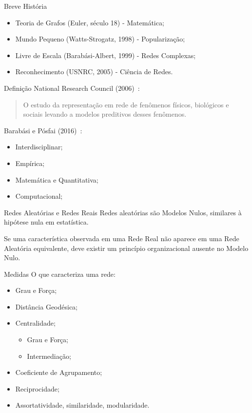 \documentclass[10pt, hyperref={pdfpagelabels=false}]{beamer}
\begin{document}
\begin{frame}[label=historia]{Breve História}
  \begin{itemize}
    \item Teoria de Grafos (Euler, século 18) - Matemática;
    \item Mundo Pequeno (Watts-Strogatz, 1998) - Popularização;
    \item Livre de Escala (Barabási-Albert, 1999) - Redes Complexas;
    \item Reconhecimento (USNRC, 2005) - \alert{Ciência de Redes}.
  \end{itemize}
\end{frame}

\begin{frame}[label=definicao]{Definição}
  National Research Council (2006)~\cite{National_Research_Council2006-lv}:
  \begin{quote}
    O estudo da representação em rede de fenômenos físicos, biológicos e sociais levando a modelos preditivos desses fenômenos.
  \end{quote}
  Barabási e Pósfai (2016)~\cite{Barabasi2016-rn}:
  \begin{itemize}
    \item Interdisciplinar;
    \item Empírica;
    \item Matemática e Quantitativa;
    \item Computacional;
  \end{itemize}
\end{frame}

\begin{frame}[label=redes]{Redes Aleatórias e Redes Reais}
Redes aleatórias são \alert{Modelos Nulos}, similares à hipótese nula em estatística.

Se uma característica observada em uma \alert{Rede Real} não aparece em uma \alert{Rede Aleatória} equivalente, deve existir um \alert{princípio organizacional} ausente no Modelo Nulo.
\end{frame}

\begin{frame}[label=medidas]{Medidas}
  O que caracteriza uma rede:
  \begin{itemize}
    \item Grau e Força;
    \item Distância Geodésica;
    \item Centralidade;
    \begin{itemize}
      \item Grau e Força;
      \item Intermediação;
    \end{itemize}
    \item Coeficiente de Agrupamento;
    \item Reciprocidade;
    \item Assortatividade, similaridade, modularidade.
  \end{itemize}
\end{frame}
\end{document}
